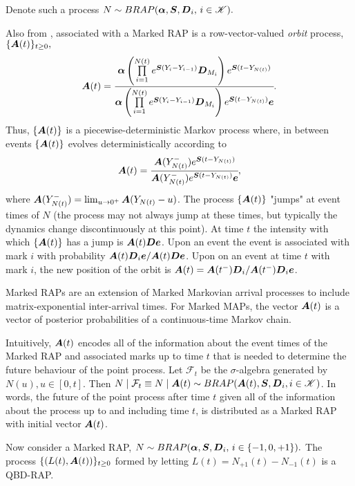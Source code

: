 Denote such a process \(N\sim BRAP(\boldsymbol \alpha, \boldsymbol S, \boldsymbol D_i,\,i\in\mathscr K).\)

Also from \cite{bn2010}, associated with a Marked RAP is a row-vector-valued \emph{orbit} process, \(\{\boldsymbol A(t)\}_{t\geq0},\)
\[\boldsymbol A(t) = \cfrac{\boldsymbol \alpha\left( \prod\limits_{i=1}^{N(t)} e^{\boldsymbol S(Y_{i}-Y_{i-1})}\boldsymbol D_{M_i}\right)e^{\boldsymbol S (t-Y_{N(t)})}}{\boldsymbol \alpha\left( \prod\limits_{i=1}^{N(t)} e^{\boldsymbol S(Y_{i}-Y_{i-1})}\boldsymbol D_{M_i}\right)e^{\boldsymbol S( t-Y_{N(t)})}\boldsymbol e}.\]
Thus, \(\{\boldsymbol A(t)\}\) is a piecewise-deterministic Markov process where, in between events \(\{\boldsymbol A(t)\}\) evolves deterministically according to 
\[\boldsymbol A(t) = \cfrac{\boldsymbol A(Y_{N(t)}^-)e^{\boldsymbol S(t-Y_{N(t)})}}{\boldsymbol A(Y_{N(t)}^-)e^{\boldsymbol S(t-Y_{N(t)})}\boldsymbol e},\]
where \(\boldsymbol A(Y_{N(t)}^-) = \lim_{u\to 0^+}\boldsymbol A(Y_{N(t)}-u)\). The process \(\{\boldsymbol A(t)\}\) "jumps" at event times of \(N\) (the process may not always jump at these times, but typically the dynamics change discontinuously at this point). At time \(t\) the intensity with which \(\{\boldsymbol A(t)\}\) has a jump is \(\boldsymbol A(t) \boldsymbol D\boldsymbol e\). Upon an event the event is associated with mark \(i\) with probability \(\boldsymbol A(t) \boldsymbol D_i\boldsymbol e/\boldsymbol A(t) \boldsymbol D\boldsymbol e\). Upon on an event at time \(t\) with mark \(i\), the new position of the orbit is \(\boldsymbol A(t) = \boldsymbol A(t^-) \boldsymbol D_i/\boldsymbol A(t^-) \boldsymbol D_i\boldsymbol e\). 

Marked RAPs are an extension of Marked Markovian arrival processes to include matrix-exponential inter-arrival times. For Marked MAPs, the vector \(\boldsymbol A(t)\) is a vector of posterior probabilities of a continuous-time Markov chain. 

Intuitively, \(\boldsymbol A(t)\) encodes all of the information about the event times of the Marked RAP and associated marks up to time \(t\) that is needed to determine the future behaviour of the point process. Let \(\mathcal F_{t}\) be the \(\sigma\)-algebra generated by \(N(u), u\in[0,t]\). Then \(N\mid \mathcal F_t \equiv N\mid \boldsymbol A(t) \sim BRAP(\boldsymbol A(t), \boldsymbol S, \boldsymbol D_i,i\in\mathscr K)\). In words, the future of the point process after time \(t\) given all of the information about the process up to and including time \(t\), is distributed as a Marked RAP with initial vector \(\boldsymbol A(t)\). 

Now consider a Marked RAP, \(N\sim BRAP(\boldsymbol \alpha, \boldsymbol S, \boldsymbol D_i,\,i\in\{-1,0,+1\}).\) The process \(\{(L(t),\boldsymbol A(t))\}_{t\geq0}\) formed by letting \(L(t) = N_{+1}(t) - N_{-1}(t)\) is a QBD-RAP. 
